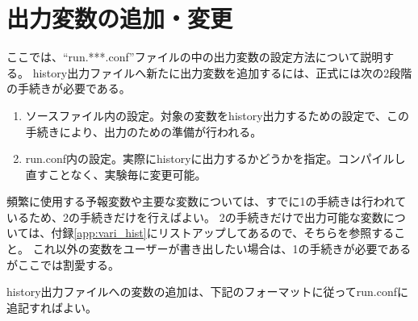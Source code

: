 

\section{出力変数の追加・変更}
\label{sec:output}
ここでは、``run.***.conf''ファイルの中の出力変数の設定方法について説明する。
history出力ファイルへ新たに出力変数を追加するには、正式には次の2段階の手続きが必要である。

\begin{enumerate}
\item ソースファイル内の設定。対象の変数をhistory出力するための設定で、この手続きにより、出力のための準備が行われる。
\item run.conf内の設定。実際にhistoryに出力するかどうかを指定。コンパイルし直すことなく、実験毎に変更可能。
\end{enumerate}
頻繁に使用する予報変数や主要な変数については、すでに1の手続きは行われているため、2の手続きだけを行えばよい。
2の手続きだけで出力可能な変数については、付録\ref{app:vari_hist}にリストアップしてあるので、そちらを参照すること。
これ以外の変数をユーザーが書き出したい場合は、1の手続きが必要であるがここでは割愛する。


history出力ファイルへの変数の追加は、下記のフォーマットに従ってrun.confに追記すればよい。\\

\\

